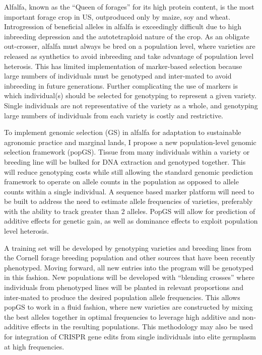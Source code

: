 \documentclass[10pt]{article}
\begin{document}
Alfalfa, known as the ``Queen of forages'' for its high protein content, is the most important forage crop in US, outproduced only by maize, soy and wheat. Introgression of beneficial alleles in alfalfa is exceedingly difficult due to high inbreeding depression and the autotetraploid nature of the crop. As an obligate out-crosser, alfalfa must always be bred on a population level, where varieties are released as synthetics to avoid inbreeding and take advantage of population level heterosis. This has limited implementation of marker-based selection because large numbers of individuals must be genotyped and inter-mated to avoid inbreeding in future generations. Further complicating the use of markers is which individual(s) should be selected for genotyping to represent a given variety. Single individuals are not representative of the variety as a whole, and genotyping large numbers of individuals from each variety is costly and restrictive.

To implement genomic selection (GS) in alfalfa for adaptation to sustainable agronomic practice and marginal lands, I propose a new population-level genomic selection framework (popGS). Tissue from many individuals within a variety or breeding line will be bulked for DNA extraction and genotyped together. This will reduce genotyping costs while still allowing the standard genomic prediction framework to operate on allele counts in the population as opposed to allele counts within a single individual. A sequence based marker platform will need to be built to address the need to estimate allele frequencies of varieties, preferably with the ability to track greater than 2 alleles. PopGS will allow for prediction of additive effects for genetic gain, as well as dominance effects to exploit population level heterosis. 

A training set will be developed by genotyping varieties and breeding lines from the Cornell forage breeding population and other sources that have been recently phenotyped. Moving forward, all new entries into the program will be genotyped in this fashion. New populations will be developed with ``blending crosses'' where individuals from phenotyped lines will be planted in relevant proportions and inter-mated to produce the desired population allele frequencies. This allows popGS to work in a fluid fashion, where new varieties are constructed by mixing the best alleles together in optimal frequencies to leverage high additive and non-additive effects in the resulting populations. This methodology may also be used for integration of CRISPR gene edits from single individuals into elite germplasm at high frequencies.
\end{document}
